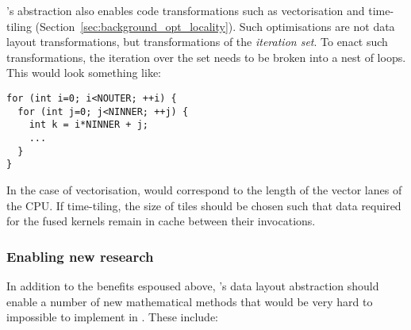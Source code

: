 's abstraction also enables code transformations such as vectorisation and time-tiling (Section~\ref{sec:background_opt_locality}).
Such optimisations are not data layout transformations, but transformations of the \textit{iteration set}.
To enact such transformations, the iteration over the set needs to be broken into a nest of loops.
This would look something like:

\begin{minipage}{\textwidth}
\begin{verbatim}
for (int i=0; i<NOUTER; ++i) {
  for (int j=0; j<NINNER; ++j) {
    int k = i*NINNER + j;
    ...
  }
}
\end{verbatim}
\end{minipage}

In the case of vectorisation,  would correspond to the length of the vector lanes of the CPU.
If time-tiling, the size of tiles should be chosen such that data required for the fused kernels remain in cache between their invocations.

\subsubsection{Enabling new research}

In addition to the benefits espoused above, 's data layout abstraction should enable a number of new mathematical methods that would be very hard to impossible to implement in .
These include:

